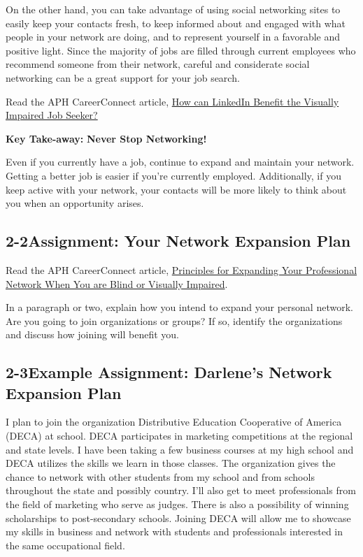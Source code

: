 On the other hand, you can take advantage of using social networking sites to easily keep your contacts fresh, to keep informed about and engaged with what people in your network are doing, and to represent yourself in a favorable and positive light. Since the majority of jobs are filled through current employees who recommend someone from their network, careful and considerate social networking can be a great support for your job search.

Read the APH CareerConnect article, \href{https://aphconnectcenter.org/careerconnect-blog/how-can-linkedin-benefit-the-job-seeker-who-is-blind-or-low-vision/}{How can LinkedIn Benefit the Visually Impaired Job Seeker?}

\textbf{Key Take-away:}
\textbf{Never Stop Networking!}

Even if you currently have a job, continue to expand and maintain your network. Getting a better job is easier if you're currently employed. Additionally, if you keep active with your network, your contacts will be more likely to think about you when an opportunity arises.


\pagebreak \subsection*{2-2\quad Assignment: Your Network Expansion Plan}
Read the APH CareerConnect article, \href{https://aphconnectcenter.org/careerconnect-blog/principles-for-expanding-your-professional-network-when-you-are-blind-or-low-vision/}{Principles for Expanding Your Professional Network When You are Blind or Visually Impaired}.

In a paragraph or two, explain how you intend to expand your personal network. Are you going to join organizations or groups? If so, identify the organizations and discuss how joining will benefit you.

\pagebreak \subsection*{2-3\quad Example Assignment: Darlene's Network Expansion Plan}
I plan to join the organization Distributive Education Cooperative of America (DECA) at school. DECA participates in marketing competitions at the regional and state levels. I have been taking a few business courses at my high school and DECA utilizes the skills we learn in those classes.
The organization gives the chance to network with other students from my school and from schools throughout the state and possibly country. I'll also get to meet professionals from the field of marketing who serve as judges. There is also a possibility of winning scholarships to post-secondary schools. Joining DECA will allow me to showcase my skills in business and network with students and professionals interested in the same occupational field.


